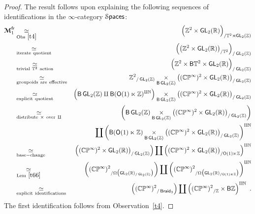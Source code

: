 \begin{proof}


The result follows upon explaining the following sequences of identifications in the $\infty$-category $\operatorname{\mathcal S\mathsf{paces}}$:
\begin{eqnarray}
\nonumber
\boldsymbol{\mathcal M}_1^{\operatorname{\sf fr}} 
&
\underset{\rm Obs~\ref{t4}}
{~\simeq~}
&
\Bigl(
\mathbb Z^2
\times
\operatorname{\sf GL}_2(\mathbb R) 
\Bigr)_{/\mathbb T^2 \rtimes \operatorname{\sf GL}_2(\mathbb Z)}
\\
\label{q2}
&
\underset{\rm iterate~quotient}
{~\simeq~}
&
\Bigl(
\bigl(
\mathbb Z^2
\times
\operatorname{\sf GL}_2(\mathbb R) 
\bigr)_{/\mathbb T^2}
\Bigr)_{/\operatorname{\sf GL}_2(\mathbb Z)}
\\
\label{q3}
&
\underset{\rm trivial~\mathbb T^2~action}
{~\simeq~}
&
\Bigl(
\mathbb Z^2
\times
\mathsf B \mathbb T^2
\times
\operatorname{\sf GL}_2(\mathbb R) 
\Bigr)_{/\operatorname{\sf GL}_2(\mathbb Z)}
\\
\label{q4}
&
\underset{\rm groupoids~are~effective}
{~\simeq~}
&
{\mathbb Z^2} _{/\operatorname{\sf GL}_2(\mathbb Z)}
\underset{ \mathsf B \operatorname{\sf GL}_2(\mathbb Z) }
\times
\bigl(
(\mathbb C\mathbb P^\infty)^2\times \operatorname{\sf GL}_2(\mathbb R) 
\bigr)_{/\operatorname{\sf GL}_2(\mathbb Z)}
\\
\label{q5}
&
\underset{\rm explicit~quotient}
{~\simeq~}
&
\Bigl(
\mathsf B \operatorname{\sf GL}_2(\mathbb Z) \amalg \mathsf B (\mathsf O(1) \ltimes \mathbb Z)^{\amalg \mathbb N}
\Bigr)
\underset{ \mathsf B \operatorname{\sf GL}_2(\mathbb Z) }
\times
\bigl(
(\mathbb C\mathbb P^\infty)^2\times \operatorname{\sf GL}_2(\mathbb R) 
\bigr)_{/\operatorname{\sf GL}_2(\mathbb Z)}
\\
\label{q6}
&
\underset{\rm distribute~\times~over~\amalg}
{~\simeq~}
&
\left(
\mathsf B \operatorname{\sf GL}_2(\mathbb Z)
\underset{ \mathsf B \operatorname{\sf GL}_2(\mathbb Z) }
\times
\bigl(
(\mathbb C\mathbb P^\infty)^2\times \operatorname{\sf GL}_2(\mathbb R) 
\bigr)_{/\operatorname{\sf GL}_2(\mathbb Z)}
\right)
\\
\nonumber
&
&
\coprod
\left(
\mathsf B (\mathsf O(1) \ltimes \mathbb Z)
\underset{ \mathsf B \operatorname{\sf GL}_2(\mathbb Z) }
\times
\bigl(
(\mathbb C\mathbb P^\infty)^2\times \operatorname{\sf GL}_2(\mathbb R) 
\bigr)_{/\operatorname{\sf GL}_2(\mathbb Z)}
\right)^{\amalg \mathbb N}
\\
\label{q7}
&
\underset{\rm base-change}
{~\simeq~}
&
\left(
(\mathbb C\mathbb P^\infty)^2\times \operatorname{\sf GL}_2(\mathbb R) 
\bigr)_{/\operatorname{\sf GL}_2(\mathbb Z)}
\right)
\coprod
\left(
(\mathbb C\mathbb P^\infty)^2\times \operatorname{\sf GL}_2(\mathbb R) 
\bigr)_{/\mathsf O(1) \ltimes \mathbb Z}
\right)^{\amalg \mathbb N}
\\
\label{q8}
&
\underset{\rm Lem~\ref{t66}}
{~\simeq~}
&
\left(
{
(\mathbb C\mathbb P^\infty)^2
}_{/\Omega \bigl(\operatorname{\sf GL}_2(\mathbb R)_{/\operatorname{\sf GL}_2(\mathbb Z)} \bigr)}
\right)
\coprod
\left(
{
(\mathbb C\mathbb P^\infty)^2
}_{/\Omega \bigl(\operatorname{\sf GL}_2(\mathbb R)_{/\mathsf O(1)\ltimes \mathbb Z} \bigr)}
\right)^{\amalg \mathbb N}
\\
\label{q9}
&
\underset{\rm explicit~identifications}
{~\simeq~}
&
\left(
{
(\mathbb C\mathbb P^\infty)^2
}_{/\operatorname{{\sf Braid}_3}}
\right)
\coprod
\left(
{
(\mathbb C\mathbb P^\infty)^2
}_{/\mathbb Z}
\times 
\mathsf B \mathbb Z
\right)^{\amalg \mathbb N}
~.
\end{eqnarray}
The first identification follows from Observation~\ref{t4}.

\end{proof}
